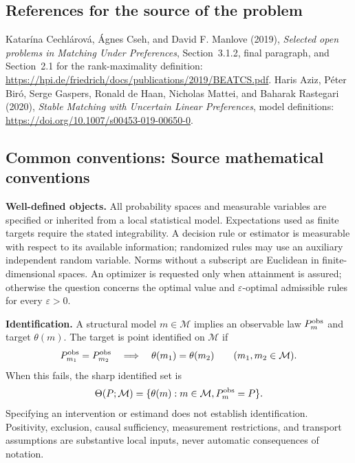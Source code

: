 \documentclass[11pt,a4paper]{article}
\begin{document}
\subsection*{References for the source of the problem}
Katar\'ina Cechl\'arov\'a, \'Agnes Cseh, and David F. Manlove (2019), \emph{Selected open problems in Matching Under Preferences}, Section~3.1.2, final paragraph, and Section~2.1 for the rank-maximality definition: \url{https://hpi.de/friedrich/docs/publications/2019/BEATCS.pdf}. Haris Aziz, P\'eter Bir\'o, Serge Gaspers, Ronald de Haan, Nicholas Mattei, and Baharak Rastegari (2020), \emph{Stable Matching with Uncertain Linear Preferences}, model definitions: \url{https://doi.org/10.1007/s00453-019-00650-0}.

\subsection*{Common conventions: Source mathematical conventions}

\textbf{Well-defined objects.}
All probability spaces and measurable variables are specified or inherited
from a local statistical model. Expectations used as finite targets require
the stated integrability. A decision rule or estimator is measurable with
respect to its available information; randomized rules may use an auxiliary
independent random variable. Norms without a subscript are Euclidean in
finite-dimensional spaces. An optimizer is requested only when attainment
is assured; otherwise the question concerns the optimal value and
$\varepsilon$-optimal admissible rules for every $\varepsilon>0$.

\textbf{Identification.}
A structural model $m\in\mathcal M$ implies an observable law
$P_m^{\rm obs}$ and target $\theta(m)$. The target is point identified on
$\mathcal M$ if
\[
 P_{m_1}^{\rm obs}=P_{m_2}^{\rm obs}
 \quad\Longrightarrow\quad\theta(m_1)=\theta(m_2)
 \qquad(m_1,m_2\in\mathcal M).
\]
When this fails, the sharp identified set is
\[
 \Theta(P;\mathcal M)=\{\theta(m):m\in\mathcal M,
                                  P_m^{\rm obs}=P\}.
\]
Specifying an intervention or estimand does not establish identification.
Positivity, exclusion, causal sufficiency, measurement restrictions, and
transport assumptions are substantive local inputs, never automatic
consequences of notation.
\end{document}
